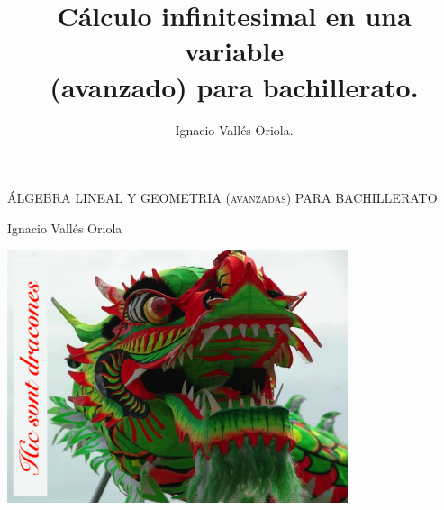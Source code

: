 \documentclass[a5paper, 10pt, spanish]{book}
\title{Cálculo infinitesimal en una variable \\ (avanzado) para bachillerato.}
\author{Ignacio Vallés Oriola.}
\date{}
\numberwithin{equation}{chapter}
\numberwithin{lema}{chapter}
\numberwithin{teor}{chapter}
\numberwithin{coro}{chapter}
\numberwithin{prop}{chapter}
\numberwithin{defi}{chapter}
\numberwithin{axio}{chapter}
\numberwithin{ejem}{chapter}
\numberwithin{ejre}{chapter}
\numberwithin{ejer}{chapter}
\numberwithin{ayud}{chapter}
\numberwithin{solu}{chapter}
\begin{document}
\begin{titlepage}
	\centering
	\vspace*{\fill}
	{\scshape\LARGE ÁLGEBRA LINEAL Y GEOMETRIA (avanzadas) PARA BACHILLERATO\par}
	\vspace{1cm}
	{\Large Ignacio Vallés Oriola \par}
	\vspace{3cm}
	\includegraphics[width=0.75\textwidth]{imagenes/hic-svnt-dracones}
	\vspace{3cm}
\end{titlepage}

\tableofcontents















\appendix

		
\end{document}
